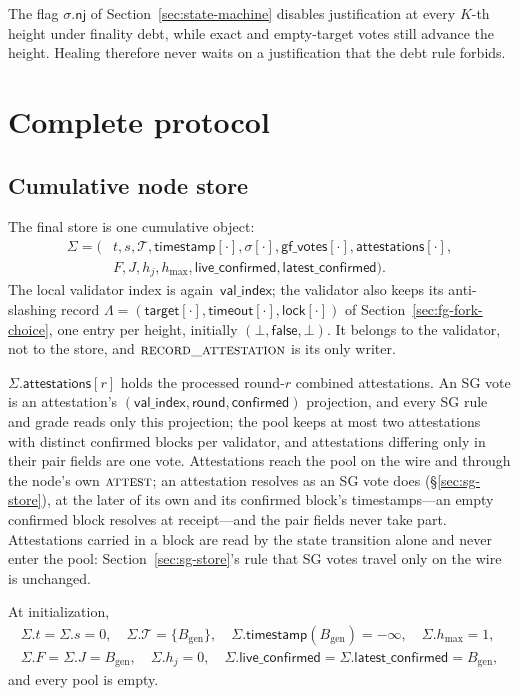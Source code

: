 \documentclass{article}
\theoremstyle{plain}
\theoremstyle{definition}
\theoremstyle{remark}
\newcommand{\genesis}{B_{\mathrm{gen}}}
\newcommand{\valindex}{\mathsf{val\_index}}
\newcommand{\round}{\mathsf{round}}
\newcommand{\confirmedf}{\mathsf{confirmed}}
\newcommand{\nj}{\mathsf{nj}}
\newcommand{\T}{\mathcal T}
\newcommand{\hmax}{h_{\max}}
\newcommand{\gfPool}{\mathsf{gf\_votes}}
\newcommand{\attestations}{\mathsf{attestations}}
\newcommand{\liveConfirmed}{\mathsf{live\_confirmed}}
\newcommand{\latestConfirmed}{\mathsf{latest\_confirmed}}
\newcommand{\timestamp}{\mathsf{timestamp}}
\begin{document}
The flag $\sigma.\nj$ of Section~\ref{sec:state-machine} disables justification
at every $K$-th height under finality debt, while exact and empty-target
votes still advance the height.  Healing therefore never waits on a
justification that the debt rule forbids.

\section{Complete protocol}\label{sec:complete-protocol}

\subsection{Cumulative node store}\label{sec:complete-store}

The final store is one cumulative object:
\[
\begin{split}
 \Sigma=(&t,s,\T,\timestamp[\cdot],\sigma[\cdot],
 \gfPool[\cdot],\attestations[\cdot],\\
 &F,J,h_j,\hmax,
 \liveConfirmed,\latestConfirmed).
\end{split}
\]
The local validator index is again~$\valindex$; the validator also keeps its
anti-slashing record
$\Lambda=(\mathsf{target}[\cdot],\mathsf{timeout}[\cdot],
\mathsf{lock}[\cdot])$ of Section~\ref{sec:fg-fork-choice}, one entry
per height, initially $(\bot,\mathsf{false},\bot)$.  It belongs to the
validator, not to the store, and $\Call{record\_attestation}{}$ is its
only writer.

$\Sigma.\attestations[r]$ holds the processed round-$r$ combined attestations.
An SG vote is an attestation's $(\valindex,\round,\confirmedf)$ projection,
and every SG rule and grade reads only this projection; the
pool keeps at most two attestations with distinct confirmed blocks per validator,
and attestations differing only in their pair fields are one vote.
Attestations reach the pool on the wire and through the node's own
$\Call{attest}{}$; an attestation resolves as an SG vote does
(\S\ref{sec:sg-store}), at the later of its own and its confirmed
block's timestamps---an empty confirmed block resolves at receipt---and
the pair fields never take part.
Attestations carried in a block are read by the state
transition alone and never enter the pool: Section~\ref{sec:sg-store}'s
rule that SG votes travel only on the wire is unchanged.

At initialization,
\[
 \begin{gathered}
 \Sigma.t=\Sigma.s=0,\quad \Sigma.\T=\{\genesis\},\quad
 \Sigma.\timestamp(\genesis)=-\infty,\quad \Sigma.\hmax=1,\\
 \Sigma.F=\Sigma.J=\genesis,\quad \Sigma.h_j=0,\quad
 \Sigma.\liveConfirmed=\Sigma.\latestConfirmed=\genesis,
 \end{gathered}
\]
and every pool is empty.
\end{document}
